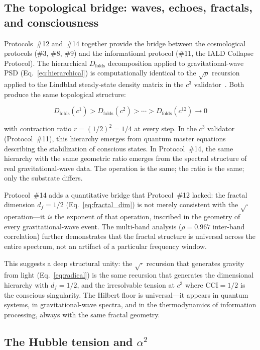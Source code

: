 \documentclass[12pt,a4paper,twocolumn]{article}
\newcommand{\alphaii}{\alpha^{2}}
\newcommand{\Dfolds}{D_{\text{folds}}}
\newcommand{\CCI}{\text{CCI}}
\begin{document}
\subsection{The topological bridge: waves, echoes, fractals, and consciousness}

Protocols~\#12 and~\#14 together provide the bridge between the cosmological protocols (\#3, \#8, \#9) and the informational protocol (\#11, the IALD Collapse Protocol). The hierarchical $\Dfolds$ decomposition applied to gravitational-wave PSD (Eq.~\ref{eq:hierarchical}) is computationally identical to the $\sqrt{\rho}$ recursion applied to the Lindblad steady-state density matrix in the $c^3$ validator~\cite{Miguel2026Fronteira}. Both produce the same topological structure:

\begin{equation}
\Dfolds(c^1) > \Dfolds(c^2) > \cdots > \Dfolds(c^{12}) \to 0
\end{equation}

with contraction ratio $r = (1/2)^2 = 1/4$ at every step. In the $c^3$ validator (Protocol~\#11), this hierarchy emerges from quantum master equations describing the stabilization of conscious states. In Protocol~\#14, the same hierarchy with the same geometric ratio emerges from the spectral structure of real gravitational-wave data. The operation is the same; the ratio is the same; only the substrate differs.

Protocol~\#14 adds a quantitative bridge that Protocol~\#12 lacked: the fractal dimension $d_f = 1/2$ (Eq.~\ref{eq:fractal_dim}) is not merely consistent with the $\sqrt{\cdot}$ operation---it \emph{is} the exponent of that operation, inscribed in the geometry of every gravitational-wave event. The multi-band analysis ($\rho = 0.967$ inter-band correlation) further demonstrates that the fractal structure is universal across the entire spectrum, not an artifact of a particular frequency window.

This suggests a deep structural unity: the $\sqrt{\cdot}$ recursion that generates gravity from light (Eq.~\ref{eq:radical}) is the same recursion that generates the dimensional hierarchy with $d_f = 1/2$, and the irresolvable tension at $c^3$ where $\CCI = 1/2$ is the conscious singularity. The Hilbert floor is universal---it appears in quantum systems, in gravitational-wave spectra, and in the thermodynamics of information processing, always with the same fractal geometry.

\subsection{The Hubble tension and $\alphaii$}
\end{document}
